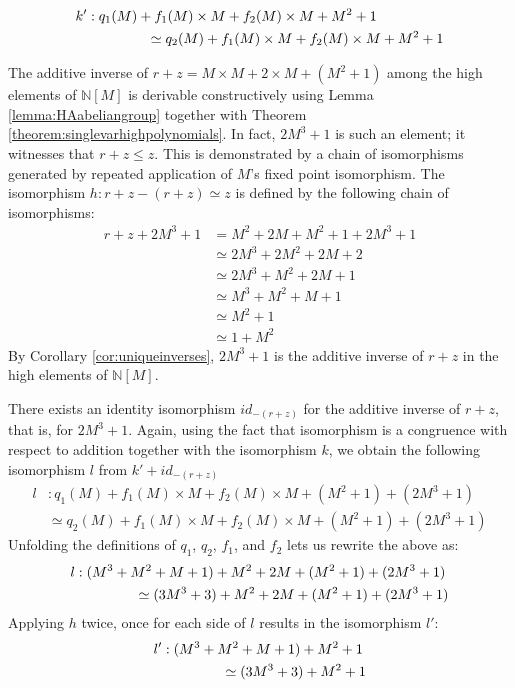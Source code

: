 \documentclass{msthesis}
\theoremstyle{definition}
\newcommand{\nat}{\mathbb{N}}
\begin{document}
\begin{align*}
    k' &: q_1(M) + f_1(M)\times M + f_2(M)\times M + M^2 + 1 \\
    &\hspace{1.5cm}\simeq q_2(M) + f_1(M) \times M + f_2(M)\times M + M^2 + 1
\end{align*}

The additive inverse of $r + z = M \times M + 2\times M + (M^2 + 1)$ among the high elements of $\nat[M]$ is derivable constructively using Lemma \ref{lemma:HAabeliangroup} together with Theorem \ref{theorem:singlevarhighpolynomials}. In fact, $2M^3+1$ is such an element; it witnesses that $r + z \le z$.  This is demonstrated by a chain of isomorphisms generated by repeated application of $M$'s fixed point isomorphism.  The isomorphism
$h : r+z-(r+z) \simeq z$
is defined by the following chain of isomorphisms:
\begin{align*}
     r + z + 2M^3 + 1
    &= M^2 + 2M + M^2 + 1 + 2M^3 + 1 \\
    &\simeq 2M^3 + 2M^2 + 2M + 2 \\
    &\simeq 2M^3 + M^2 + 2M + 1 \\
    &\simeq M^3 + M^2 + M + 1 \\
    &\simeq M^2 + 1 \\
    &\simeq 1 + M^2
\end{align*}
By Corollary \ref{cor:uniqueinverses}, $2M^3 + 1$ is the additive inverse of $r + z$ in the high elements of $\nat[M]$.  

There exists an identity isomorphism $id_{-(r+z)}$ for the additive inverse of $r + z$, that is, for $2M^3 + 1$. Again, using the fact that isomorphism is a congruence with respect to addition together with the isomorphism $k$, we obtain the following isomorphism $l$ from $k' + id_{-(r+z)}$
\begin{align*}
    l &: q_1(M) + f_1(M)\times M + f_2(M)\times M + (M^2 + 1) + (2M^3 + 1) \\
    &\simeq q_2(M) + f_1(M) \times M + f_2(M)\times M + (M^2 + 1) + (2M^3 + 1)
\end{align*}
Unfolding the definitions of $q_1$, $q_2$, $f_1$, and $f_2$ lets us rewrite the above as:
\begin{align*}
    l &: (M^3 + M^2 + M + 1) + M^2 + 2M + (M^2 + 1) + (2M^3 + 1) \\
    &\hspace{1.5cm}\simeq (3M^3+3) + M^2 + 2M + (M^2 + 1) + (2M^3 + 1)
\end{align*}
Applying $h$ twice, once for each side of $l$ results in the isomorphism $l'$:
\begin{align*}
    l' &: (M^3 + M^2 + M + 1) + M^2 + 1 \\
    &\hspace{1.5cm}\simeq (3M^3+3) + M^2 + 1
\end{align*}
\end{document}
